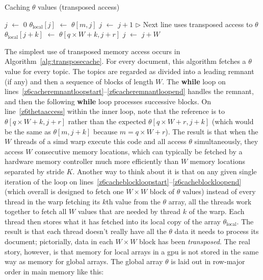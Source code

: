 \documentclass[10pt,nohyperref]{sigplanconf}
\newcommand*\Assign[2]{\State #1 $\gets$ #2}
\newcommand*\Bind[2]{\State {\bf let} #1 $\gets$ #2}
\newcommand*\Remark[1]{\State \(\triangleright\) #1}
\begin{document}
\begin{algorithm}[t]
\caption{Caching $\theta$ values (transposed access)}\label{alg:transposecache}
\begin{algorithmic}[1]
          \Bind{$j$}{$0$}
               \label{z6cacheremnantloopstart}
               \Assign{$\theta_{\mathrm{local}}[j]$}{$\theta[m, j]$}
               \Assign{$j$}{$j + 1$}
            \EndWhile    \label{z6cacheremnantloopend}
                  \label{z6cacheblockloopstart}
                  \Remark{Next line uses transposed access to $\theta$}
                  \Assign{$\theta_{\mathrm{local}}[j+k]$}{$\theta[q \times W + k, j+r]$}     \label{z6thetaaccess}
               \EndFor    \label{z6cacheblockloopend}
              \Assign{$j$}{$j + W$}
            \EndWhile
\End
\end{algorithmic}
\end{algorithm}

The simplest use of transposed memory access occurs in Algorithm~\ref{alg:transposecache}.
For every document, this algorithm fetches a $\theta$ value for every topic.
The topics are regarded as divided into a leading remnant (if any) and then a sequence
of blocks of length $W$.  The {\bf while} loop on lines~\hbox{\ref{z6cacheremnantloopstart}--\ref{z6cacheremnantloopend}}
handles the remnant, and then the following {\bf while} loop processes successive blocks.
On line~\ref{z6thetaaccess} within the inner loop,
note that the reference is to $\theta[q \times W + k, j+r]$ rather than the expected $\theta[q \times W + r, j+k]$
(which would be the same as $\theta[m, j+k]$ because $m=q \times W + r$).  The result is that when
the $W$ threads of a {\sc simd} warp execute this code and all access $\theta$ simultaneously, they access
$W$ consecutive memory locations, which can typically be fetched by a hardware memory controller
much more efficiently than $W$ memory locations separated by stride $K$.
Another way to think about it is that on any given single iteration of the loop on
lines~\hbox{\ref{z6cacheblockloopstart}--\ref{z6cacheblockloopend}}
(which overall is designed to fetch one $W\times W$ block of $\theta$ values)
instead of every thread in the warp fetching its $k$th value from the $\theta$ array,
all the threads work together to fetch all $W$ values that are needed by thread $k$ of the warp.
Each thread then stores what it has fetched into its local copy of the array $\theta_{\mathrm{local}}$.
The result is that each thread doesn't really have all the $\theta$ data it needs to process its
document; pictorially, data in each $W \times W$ block has been \emph{transposed}.
The real story, however, is that memory for local arrays in a {\sc gpu} is not stored in the same way as memory for global arrays.
The global array $\theta$ is laid out in row-major order in main memory like this:
\end{document}
